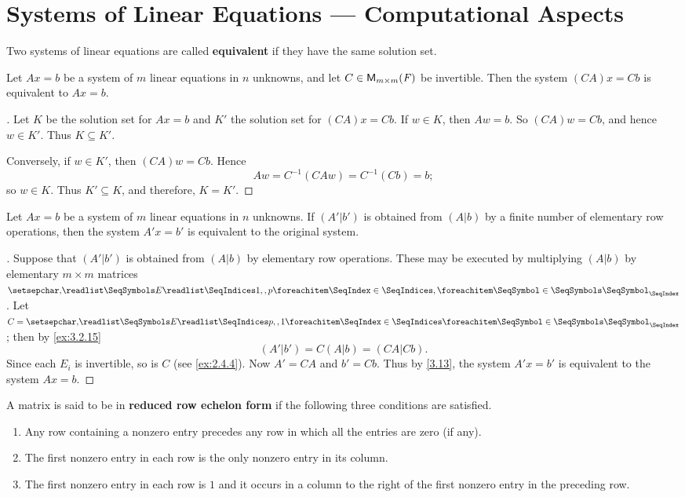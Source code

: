 \section{Systems of Linear Equations --- Computational Aspects}\label{sec:3.4}

\begin{defn}\label{3.4.1}
  Two systems of linear equations are called \textbf{equivalent} if they have the same solution set.
\end{defn}

\begin{thm}\label{3.13}
  Let \(Ax = b\) be a system of \(m\) linear equations in \(n\) unknowns, and let \(C \in \mathsf{M}_{{m} \times m}({\mathit{F}})\) be invertible.
  Then the system \((CA)x = Cb\) is equivalent to \(Ax = b\).
\end{thm}

\begin{proof}[]
  Let \(K\) be the solution set for \(Ax = b\) and \(K'\) the solution set for \((CA)x = Cb\).
  If \(w \in K\), then \(Aw = b\).
  So \((CA)w = Cb\), and hence \(w \in K'\).
  Thus \(K \subseteq K'\).

  Conversely, if \(w \in K'\), then \((CA)w = Cb\).
  Hence
  \[
    Aw = C^{-1} (CAw) = C^{-1} (Cb) = b;
  \]
  so \(w \in K\).
  Thus \(K' \subseteq K\), and therefore, \(K = K'\).
\end{proof}

\begin{cor}\label{3.4.2}
  Let \(Ax = b\) be a system of \(m\) linear equations in \(n\) unknowns.
  If \((A' | b')\) is obtained from \((A | b)\) by a finite number of elementary row operations, then the system \(A' x = b'\) is equivalent to the original system.
\end{cor}

\begin{proof}[]
  Suppose that \((A' | b')\) is obtained from \((A | b)\) by elementary row operations.
  These may be executed by multiplying \((A | b)\) by elementary \(m \times m\) matrices \(\seq{E}{1,,p}\).
  Let \(C = \seq[]{E}{p,,1}\);
  then by \cref{ex:3.2.15}
  \[
    (A' | b') = C (A | b) = (CA | Cb).
  \]
  Since each \(E_i\) is invertible, so is \(C\)
  (see \cref{ex:2.4.4}).
  Now \(A' = CA\) and \(b' = Cb\).
  Thus by \cref{3.13}, the system \(A' x = b'\) is equivalent to the system \(Ax = b\).
\end{proof}

\begin{defn}\label{3.4.3}
  A matrix is said to be in \textbf{reduced row echelon form} if the following three conditions are satisfied.
  \begin{enumerate}
    \item Any row containing a nonzero entry precedes any row in which all the entries are zero (if any).
    \item The first nonzero entry in each row is the only nonzero entry in its column.
    \item The first nonzero entry in each row is \(1\) and it occurs in a column to the right of the first nonzero entry in the preceding row.
  \end{enumerate}
\end{defn}

